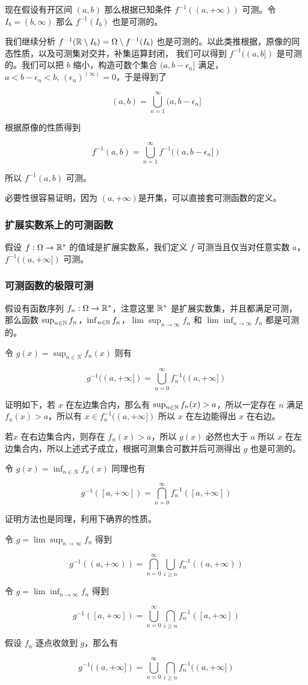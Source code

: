 现在假设有开区间 $(a,b)$ 那么根据已知条件 $f^{-1}((a,+\infty))$ 可测。令 $I_b = (b, \infty)$ 那么 $f^{-1}(I_b)$ 也是可测的。

我们继续分析 $f^{-1}(\mathbb{R} \setminus I_b) = \Omega \setminus f^{-1}(I_b)$ 也是可测的。以此类推根据，原像的同态性质，以及可测集对交并，补集运算封闭，
我们可以得到 $f^{-1}((a,b])$ 是可测的。我们可以把 $b$ 缩小，构造可数个集合 $(a, b - \epsilon_n]$ 满足，$a < b - \epsilon_n < b,\, (\epsilon_n)^{(\infty)} = 0$，于是得到了

\[
(a,b) = \bigcup_{n=1}^{\infty}(a, b - \epsilon_n]
\]

根据原像的性质得到

\[
f^{-1}(a,b) = \bigcup_{n=1}^{\infty} f^{-1}((a, b - \epsilon_n])
\]

所以 $f^{-1}(a,b)$ 可测。


必要性很容易证明，因为 $(a, +\infty)$是开集，可以直接套可测函数的定义。

\subsubsection{扩展实数系上的可测函数}

假设 $f: \Omega \to \mathbb{R}^*$ 的值域是扩展实数系，我们定义 $f$ 可测当且仅当对任意实数 $a$，$f^{-1}((a, +\infty])$ 可测。


\subsubsection{可测函数的极限可测}

假设有函数序列 $f_n: \Omega \to \mathbb{R}^*$，注意这里 $\mathbb{R}^*$ 是扩展实数集，并且都满足可测，
那么函数 $\sup_{n \in \mathbb{N}} f_n$，$\inf_{n \in \mathbb{N}}f_n$，$\lim \sup_{n \to \infty}f_n$ 和 
$\lim \inf_{n \to \infty}f_n$ 
都是可测的。

令 $g(x) = \sup_{n \in N}f_n(x)$ 则有

\[
g^{-1}((a, +\infty]) = \bigcup_{n = 0}^{\infty}f_n^{-1}((a, +\infty])
\]

证明如下，若 $x$ 在左边集合内，那么有 $\sup_{n \in \mathbb{N}}f_n(x) > a$，所以一定存在 $n$ 满足 $f_n(x) > a$，所以有 $x \in f_n^{-1}((a, +\infty])$
所以 $x$ 在左边能得出 $x$ 在右边。

若$x$ 在右边集合内，则存在 $f_n(x) > a$，所以 $g(x)$ 必然也大于 $a$ 所以 $x$ 在左边集合内，所以上述式子成立，根据可测集合可数并后可测得出 $g$ 也是可测的。


令 $g(x) = \inf_{n \in N}f_n(x)$ 同理也有

\[
g^{-1}([a, +\infty]) = \bigcap_{n = 0}^{\infty}f_n^{-1}([a, +\infty])
\]

证明方法也是同理，利用下确界的性质。

令 $g = \lim \sup_{n \to \infty}f_n$
得到

\[
g^{-1}((a, +\infty)) = \bigcap_{n = 0}^{\infty}\bigcup_{i \ge n}f_n^{-1}((a, +\infty))
\]


令 $g = \lim \inf_{n \to \infty}f_n$
得到

\[
g^{-1}([a, +\infty]) = \bigcup_{n = 0}^{\infty}\bigcap_{i \ge n}f_n^{-1}([a, +\infty])
\]

假设 $f_n$ 逐点收敛到 $g$，那么有

\[
g^{-1}((a, +\infty]) = \bigcup_{n = 0}^{\infty}\bigcap_{i \ge n}f_n^{-1}((a, +\infty])
\]

